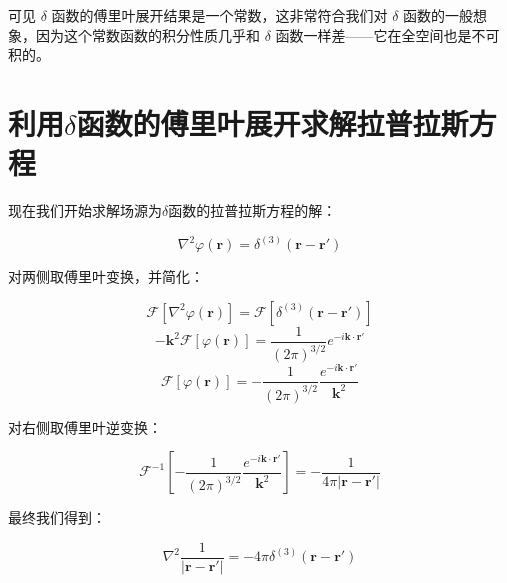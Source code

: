 \documentclass[lang=cn,10pt,newtx,bibend=biber,device=pad]{elegantbook}
\begin{document}
可见 $\delta$ 函数的傅里叶展开结果是一个常数，这非常符合我们对 $\delta$ 函数的一般想象，因为这个常数函数的积分性质几乎和 $\delta$ 函数一样差——它在全空间也是不可积的。
\section{利用$\delta$函数的傅里叶展开求解拉普拉斯方程}

现在我们开始求解场源为$\delta$函数的拉普拉斯方程的解：

\begin{equation}
\nabla^2 \varphi(\mathbf{r}) = \delta^{(3)}(\mathbf{r}-\mathbf{r'})
\end{equation}

对两侧取傅里叶变换，并简化：

\begin{equation}
\mathcal{F}[\nabla^2 \varphi(\mathbf{r})] = \mathcal{F}[\delta^{(3)}(\mathbf{r}-\mathbf{r'})]
\end{equation}
\begin{equation}
-\mathbf{k}^2\mathcal{F}[\varphi(\mathbf{r})]=\frac{1}{(2\pi)^{3/2}}e^{-i\mathbf{k}\cdot\mathbf{r'}}
\end{equation}
\begin{equation}
\mathcal{F}[\varphi(\mathbf{r})]=-\frac{1}{(2\pi)^{3/2}}\frac{e^{-i\mathbf{k}\cdot\mathbf{r'}}}{\mathbf{k}^2}
\end{equation}

对右侧取傅里叶逆变换：

\begin{equation}
\mathcal{F}^{-1}\left[-\frac{1}{(2\pi)^{3/2}}\frac{e^{-i\mathbf{k}\cdot\mathbf{r'}}}{\mathbf{k}^2}\right] = -\frac{1}{4\pi|\mathbf{r}-\mathbf{r'}|}
\end{equation}

最终我们得到：

\begin{equation}
\nabla^2 \frac{1}{|\mathbf{r}-\mathbf{r'}|} = -4\pi \delta^{(3)}(\mathbf{r}-\mathbf{r'})
\end{equation}
\end{document}
